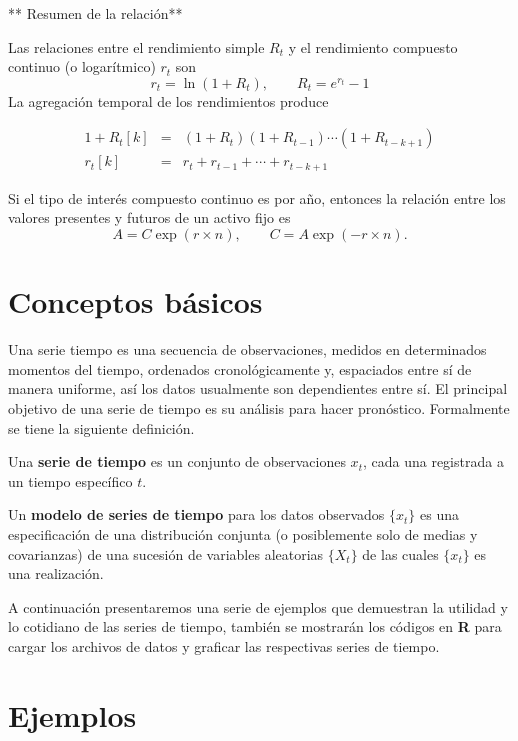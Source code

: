 \documentclass[12pt,]{krantz}
\theoremstyle{definition}
\theoremstyle{definition}
\theoremstyle{definition}
\theoremstyle{remark}
\let\BeginKnitrBlock\begin \let\EndKnitrBlock\end
\begin{document}
** Resumen de la relación**

Las relaciones entre el rendimiento simple \(R_t\) y el rendimiento
compuesto continuo (o logarítmico) \(r_t\) son
\[r_t=\ln(1+R_t), \qquad R_t=e^{r_t}-1\] La agregación temporal de los
rendimientos produce

\begin{eqnarray*}
1+R_t[k] &=& (1+R_t)(1+R_{t-1})\cdots(1+R_{t-k+1}) \\
  r_t[k] &=& r_t+r_{t-1}+\cdots+r_{t-k+1}
\end{eqnarray*}

Si el tipo de interés compuesto continuo es por año, entonces la
relación entre los valores presentes y futuros de un activo fijo es
\[A = C\exp(r\times n),\qquad C=A\exp(-r\times n).\]

\section{Conceptos básicos}\label{conceptos-basicos}

Una serie tiempo es una secuencia de observaciones, medidos en
determinados momentos del tiempo, ordenados cronológicamente y,
espaciados entre sí de manera uniforme, así los datos usualmente son
dependientes entre sí. El principal objetivo de una serie de tiempo es
su análisis para hacer pronóstico. Formalmente se tiene la siguiente
definición.

\BeginKnitrBlock{definition}
\protect\hypertarget{def:defi-serie-tiempo}{}{\label{def:defi-serie-tiempo}
}Una \textbf{serie de tiempo} es un conjunto de observaciones \(x_t\),
cada una registrada a un tiempo específico \(t\).
\EndKnitrBlock{definition}

\BeginKnitrBlock{definition}
\protect\hypertarget{def:defi-modelo-serie-tiempo}{}{\label{def:defi-modelo-serie-tiempo}
}Un \textbf{modelo de series de tiempo} para los datos observados
\(\{x_t\}\) es una especificación de una distribución conjunta (o
posiblemente solo de medias y covarianzas) de una sucesión de variables
aleatorias \(\{X_t\}\) de las cuales \(\{x_t\}\) es una realización.
\EndKnitrBlock{definition}

A continuación presentaremos una serie de ejemplos que demuestran la
utilidad y lo cotidiano de las series de tiempo, también se mostrarán
los códigos en \textbf{R} para cargar los archivos de datos y graficar
las respectivas series de tiempo.

\section{Ejemplos}\label{ejemplos}
\end{document}
